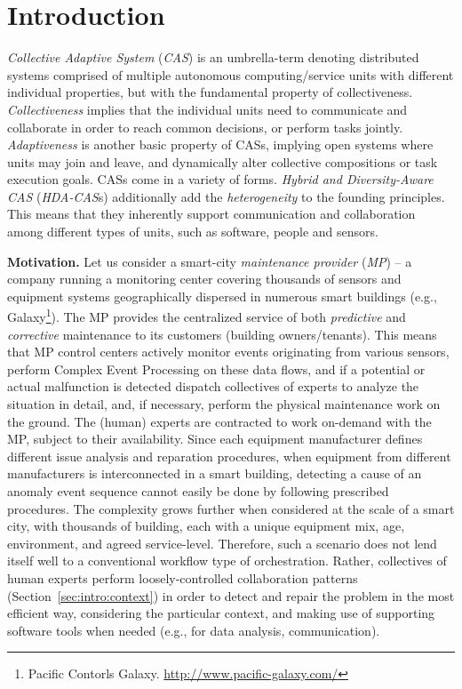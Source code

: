 \documentclass{llncs}
\begin{document}
\section{Introduction}
\label{sec:intro}

  \textit{Collective Adaptive System} (\textit{CAS}) \cite{FoCASBook} is an umbrella-term denoting distributed systems comprised of multiple autonomous computing/service units with different individual properties, but with the fundamental property of collectiveness. \emph{Collectiveness} implies that the individual units need to communicate and collaborate in order to reach common decisions, or perform tasks jointly. \emph{Adaptiveness} is another basic property of CASs, implying open systems where  units may join and leave, and dynamically alter collective compositions or task execution goals. 
  CASs come in a variety of forms. \textit{Hybrid and Diversity-Aware CAS} (\textit{HDA-CAS}s) \cite{fausto} additionally add the \emph{heterogeneity} to the founding principles. This means that they inherently support communication and collaboration among different types of units, such as software, people and sensors. 
  
  

  \textbf{Motivation. }
  Let us consider a smart-city \emph{maintenance provider} (\emph{MP}) -- a company running a monitoring center covering thousands of sensors and equipment systems geographically dispersed in numerous smart buildings (e.g., Galaxy\footnote{Pacific Contorls Galaxy. \url{http://www.pacific-galaxy.com/}}). The MP provides the centralized service of both \emph{predictive} and \emph{corrective} maintenance to its customers (building owners/tenants). This means that MP control centers actively monitor events originating from various sensors, perform Complex Event Processing on these data flows, and if a potential or actual malfunction is detected dispatch collectives of experts to analyze the situation in detail, and, if necessary, perform the physical maintenance work on the ground. The (human) experts are contracted to work on-demand with the MP, subject to their availability.
  Since each equipment manufacturer defines different issue analysis and reparation procedures, when equipment from different manufacturers is interconnected in a smart building, detecting a cause of an anomaly event sequence cannot easily be done by following prescribed procedures. The complexity grows further when considered at the scale of a smart city, with thousands of building, each with a unique equipment mix, age, environment, and agreed service-level. Therefore, such a scenario does not lend itself well to a conventional workflow type of orchestration. Rather, collectives of human experts perform loosely-controlled collaboration patterns (Section~\ref{sec:intro:context}) in order to detect and repair the problem in the most efficient way, considering the particular context, and making use of supporting software tools when needed (e.g., for data analysis, communication). 
\end{document}
